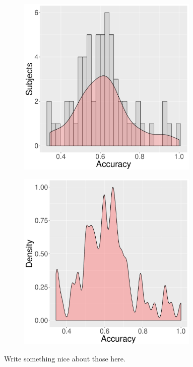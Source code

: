 \begin{figure}[ht]
\centering
  \begin{subfigure}[b]{0.5\textwidth}
    \includegraphics[width=0.95\textwidth]{figures/experiment2-hist-user}
    \caption{}
    \label{fig:experiment2-chart-hist}
  \end{subfigure}%
  \begin{subfigure}[b]{0.5\textwidth}
    \centering
    \includegraphics[width=0.95\textwidth]{figures/experiment2-density-user}
    \caption{}
    \label{fig:experiment2-chart-density}
  \end{subfigure}
  \caption{Write something nice about those here.}
  \label{fig:experiment2-result-charts}
\end{figure}

